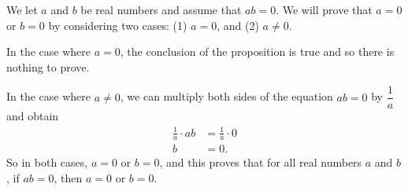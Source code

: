 \begin{myproof}
We let $a$ and $b$ be real numbers and assume that $ab = 0$.  We will prove that $a = 0$ or 
$b = 0$ by considering two cases:  (1) $a = 0$, and (2) $a \ne 0$.

In the case where $a = 0$, the conclusion of the proposition is true and so there is nothing to prove.  

In the case where $a \ne 0$, we can multiply both sides of the equation $ab = 0$ by $\dfrac{1}{a}$ and obtain
\[
\begin{aligned}
\frac{1}{a} \cdot ab &= \frac{1}{a} \cdot 0 \\
                    b & = 0.
\end{aligned}
\]
So in both cases, $a = 0$ or $b = 0$, and this proves that for all real numbers $a$ and $b$, if $ab = 0$, then $a = 0$ or $b = 0$.
\end{myproof}
%
%
\hbreak

\endinput
